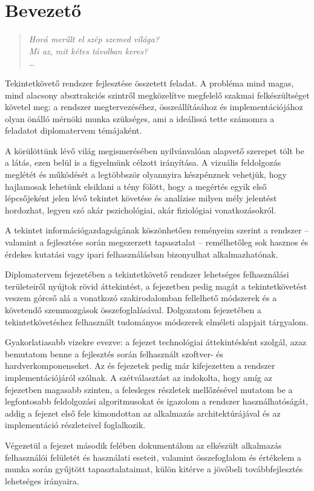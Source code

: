 \chapter*{Bevezető}

\begin{verse}
\begin{flushright}
\emph{Hová merűlt el szép szemed világa? \\
Mi az, mit kétes távolban keres?} \\
\dots
\end{flushright}
\end{verse}

Tekintetkövető rendszer fejlesztése összetett feladat. A probléma mind magas, mind alacsony absztrakciós szintről megközelítve megfelelő szakmai felkészültséget követel meg: a rendszer megtervezéséhez, összeállításához és implementációjához olyan önálló mérnöki munka szükséges, ami a ideálissá tette számomra a feladatot diplomatervem témájaként.

\bigskip

A körülöttünk lévő világ megismerésében nyilvánvalóan alapvető szerepet tölt be a látás, ezen belül is a figyelmünk célzott irányítása. A vizuális feldolgozás meglétét és működését a legtöbbször olyannyira készpénznek vehetjük, hogy hajlamosak lehetünk elsiklani a tény fölött, hogy a megértés egyik első lépcsőjeként jelen lévő tekintet követése és analízise milyen mély jelentést hordozhat, legyen szó akár pszichológiai, akár fiziológiai vonatkozásokról.

A tekintet információgazdagságának köszönhetően reményeim szerint a rendszer -- valamint a fejlesztése során megszerzett tapasztalat -- remélhetőleg sok hasznos és érdekes kutatási vagy ipari felhasználásban bizonyulhat alkalmazhatónak.

\bigskip

Diplomatervem  fejezetében a tekintetkövető rendszer lehetséges felhasználási területeiről nyújtok rövid áttekintést, a  fejezetben pedig magát a tekintetkövetést veszem górcső alá a vonatkozó szakirodalomban fellelhető módszerek és a követendő szemmozgások összefoglalásával. Dolgozatom  fejezetében a tekintetkövetéshez felhasznált tudományos módszerek elméleti alapjait tárgyalom.

Gyakorlatiasabb vizekre evezve: a  fejezet technológiai áttekintésként szolgál, azaz bemutatom benne a fejlesztés során felhasznált szoftver- és hardverkomponenseket. Az  és  fejezetek pedig már kifejezetten a rendszer implementációjáról szólnak. A szétválasztást az indokolta, hogy amíg az  fejezetben magasabb szinten, a felesleges részletek mellőzésével mutatom be a legfontosabb feldolgozási algoritmusokat és igazolom a rendszer használhatóságát, addig a  fejezet első fele kimondottan az alkalmazás architektúrájával és az implementáció részleteivel foglalkozik.

Végezetül a  fejezet második felében dokumentálom az elkészült alkalmazás felhasználói felületét és használati eseteit, valamint összefoglalom és értékelem a munka során gyűjtött tapasztalataimat, külön kitérve a jövőbeli továbbfejlesztés lehetséges irányaira.